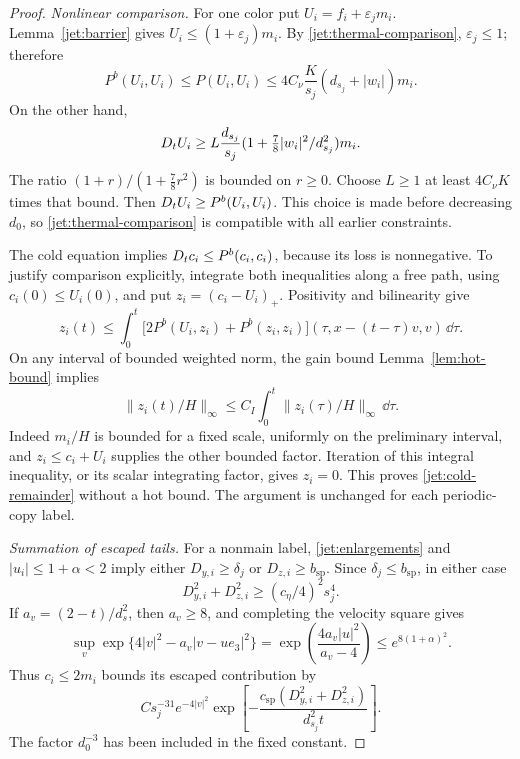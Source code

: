 \begin{proof}
\emph{Nonlinear comparison.}
For one color put \(U_i=f_i+\varepsilon_jm_i\).
Lemma~\ref{jet:barrier} gives \(U_i\le(1+\varepsilon_j)m_i\).
By \eqref{jet:thermal-comparison}, \(\varepsilon_j\le1\); therefore
\[
 P^b(U_i,U_i)\le P(U_i,U_i)
 \le4 C_\nu\frac K{s_j}(d_{s_j}+|w_i|)m_i.
\]
On the other hand,
\[
 D_t U_i\ge
 L\frac{d_{s_j}}{s_j}
       (1+\tfrac78|w_i|^2/d_{s_j}^2)m_i .
\]
The ratio
\((1+r)/(1+\tfrac78r^2)\) is bounded on \(r\ge0\).
Choose \(L\ge1\) at least \(4C_\nu K\) times that bound.
Then \(D_t U_i\ge P^b(U_i,U_i)\).
This choice is made before decreasing \(d_0\), so
\eqref{jet:thermal-comparison} is compatible with all earlier
constraints.

The cold equation implies \(D_t c_i\le P^b(c_i,c_i)\), because its
loss is nonnegative.  To justify comparison explicitly, integrate
both inequalities along a free path, using
\(c_i(0)\le U_i(0)\), and put \(z_i=(c_i-U_i)_+\).
Positivity and bilinearity give
\[
 z_i(t)\le\int_0^t
  \bigl[2P^b(U_i,z_i)+P^b(z_i,z_i)\bigr]
       (\tau,x-(t-\tau)v,v)\,\dd\tau .
\]
On any interval of bounded weighted norm, the gain bound
Lemma~\ref{lem:hot-bound} implies
\[
 \|z_i(t)/H\|_\infty
 \le C_I\int_0^t\|z_i(\tau)/H\|_\infty\,\dd\tau .
\]
Indeed \(m_i/H\) is bounded for a fixed scale, uniformly on the
preliminary interval, and
\(z_i\le c_i+U_i\) supplies the other bounded factor.
Iteration of this integral inequality, or its scalar integrating
factor, gives \(z_i=0\).  This proves
\eqref{jet:cold-remainder} without a hot bound.
The argument is unchanged for each periodic-copy label.

\emph{Summation of escaped tails.}
For a nonmain label, \eqref{jet:enlargements} and
\(|u_i|\le1+\alpha<2\) imply either \(D_{y,i}\ge\delta_j\) or
\(D_{z,i}\ge b_{\mathrm{sp}}\).
Since \(\delta_j\le b_{\mathrm{sp}}\), in either case
\[
 D_{y,i}^2+D_{z,i}^2\ge
       (c_\eta/4)^2s_j^4.
\]
If \(a_v=(2-t)/d_s^2\), then \(a_v\ge8\), and completing the
velocity square gives
\[
 \sup_v \exp\{4|v|^2-a_v|v-ue_3|^2\}
   =\exp\!\left(\frac{4a_v|u|^2}{a_v-4}\right)
   \le e^{8(1+\alpha)^2}.
\]
Thus \(c_i\le2m_i\) bounds its escaped contribution by
\begin{equation}
 C s_j^{-31}e^{-4|v|^2}
 \exp\!\left[-\frac{c_{\mathrm{sp}}
                     (D_{y,i}^2+D_{z,i}^2)}{d_{s_j}^2t}\right].
 \label{jet:tail-prefactor}
\end{equation}
The factor \(d_0^{-3}\) has been included in the fixed constant.


\end{proof}
